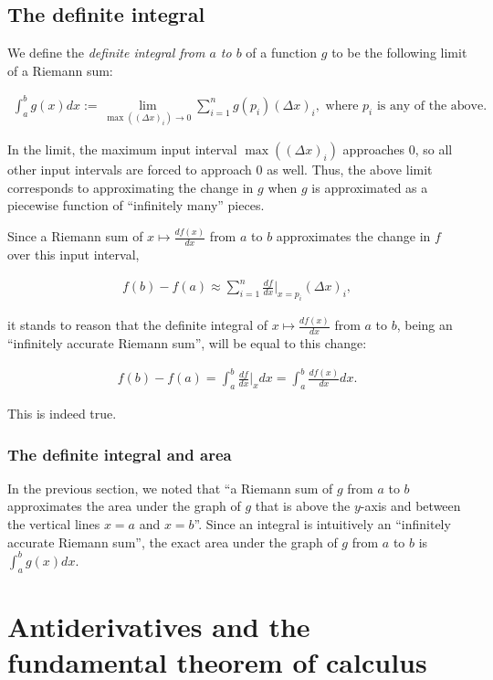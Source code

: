 \subsection*{The definite integral}

We define the \textit{definite integral from $a$ to $b$} of a function $g$ to be the following limit of a Riemann sum:

\begin{align*}
    \int_a^b g(x) dx := \lim_{\max((\Delta x)_i) \rightarrow 0} \sum_{i = 1}^n g(p_i) (\Delta x)_i, \text{ where $p_i$ is any of the above}.
\end{align*}

In the limit, the maximum input interval $\max((\Delta x)_i)$ approaches $0$, so all other input intervals are forced to approach $0$ as well. Thus, the above limit corresponds to approximating the change in $g$ when $g$ is approximated as a piecewise function of ``infinitely many'' pieces.

Since a Riemann sum of $x \mapsto \frac{df(x)}{dx}$ from $a$ to $b$ approximates the change in $f$ over this input interval,

\begin{align*}
     f(b) - f(a) \approx \sum_{i = 1}^n \frac{df}{dx}\Big|_{x = p_i} (\Delta x)_i,
\end{align*}

it stands to reason that the definite integral of $x \mapsto \frac{df(x)}{dx}$ from $a$ to $b$, being an ``infinitely accurate Riemann sum'', will be equal to this change:

\begin{align*}
    f(b) - f(a) = \int_a^b \frac{df}{dx}\Big|_x dx = \int_a^b \frac{df(x)}{dx} dx.
\end{align*}

This is indeed true.

\subsubsection*{The definite integral and area}

In the previous section, we noted that ``a Riemann sum of $g$ from $a$ to $b$ approximates the area under the graph of $g$ that is above the $y$-axis and between the vertical lines $x = a$ and $x = b$''. Since an integral is intuitively an ``infinitely accurate Riemann sum'', the exact area under the graph of $g$ from $a$ to $b$ is $\int_a^b g(x) dx$.

\section*{Antiderivatives and the fundamental theorem of calculus}

